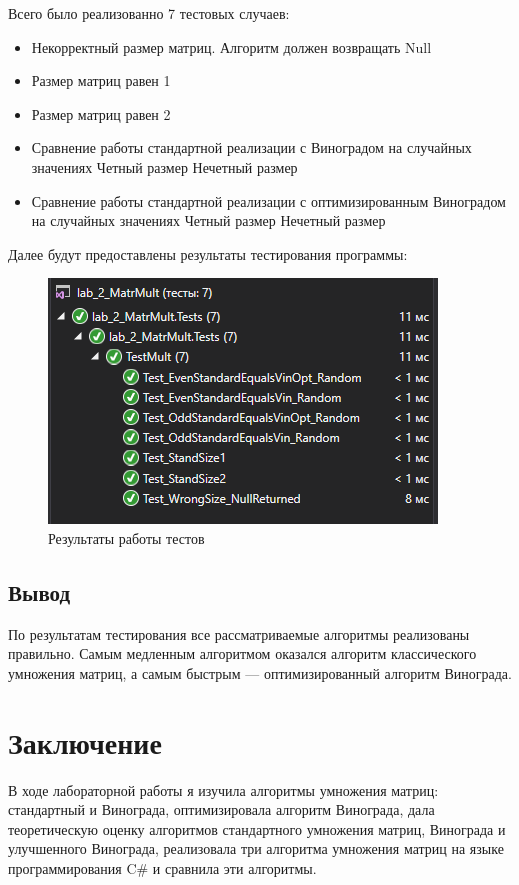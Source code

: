 \documentclass[12pt]{report}
\begin{document}
Всего было реализованно 7 тестовых случаев:
\begin{itemize}
	\item Некорректный размер матриц. Алгоритм должен возвращать Null
	\item Размер матриц равен 1
	\item Размер матриц равен 2
	\item Сравнение работы стандартной реализации с Виноградом на случайных значениях
	\subitem Четный размер
	\subitem Нечетный размер
	\item Сравнение работы стандартной реализации с оптимизированным Виноградом на случайных значениях
	\subitem Четный размер
	\subitem Нечетный размер
\end{itemize}

Далее будут предоставлены результаты тестирования программы:
\begin{figure}[!htbp]
\centering
\includegraphics[scale=0.6]{TestsPassed}
\caption{Результаты работы тестов}
\label{fig:mpr}
\end{figure}

\section{Вывод}
По результатам тестирования все рассматриваемые алгоритмы реализованы правильно. Самым медленным алгоритмом оказался алгоритм классического умножения матриц, а самым быстрым — оптимизированный алгоритм Винограда.

\chapter*{Заключение}
В ходе лабораторной работы я изучила алгоритмы умножения матриц: стандартный и Винограда, оптимизировала алгоритм Винограда, дала теоретическую оценку алгоритмов стандартного умножения матриц, Винограда и улучшенного Винограда, реализовала три алгоритма умножения матриц на языке программирования C\# и сравнила эти алгоритмы.
\end{document}
